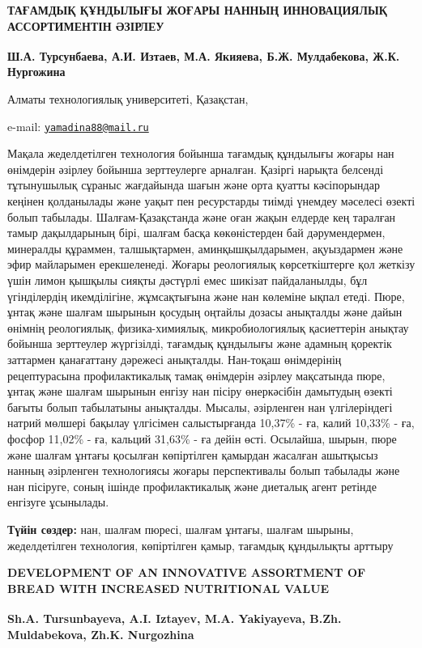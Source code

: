 \begin{articleheader}
{\bfseries ТАҒАМДЫҚ ҚҰНДЫЛЫҒЫ ЖОҒАРЫ НАННЫҢ ИННОВАЦИЯЛЫҚ АССОРТИМЕНТІН ӘЗІРЛЕУ}

{\bfseries
Ш.А. Турсунбаева,
А.И. Изтаев,
М.А. Якияева\textsuperscript{\envelope },
Б.Ж. Мулдабекова,
Ж.К. Нургожина
}
\end{articleheader}

\begin{affiliation}
Алматы технологиялық университеті, Қазақстан,

e-mail: \href{mailto:yamadina88@mail.ru}{\nolinkurl{yamadina88@mail.ru}}
\end{affiliation}

Мақала жеделдетілген технология бойынша тағамдық құндылығы жоғары нан
өнімдерін әзірлеу бойынша зерттеулерге арналған. Қазіргі нарықта
белсенді тұтынушылық сұраныс жағдайында шағын және орта қуатты
кәсіпорындар кеңінен қолданылады және уақыт пен ресурстарды тиімді
үнемдеу мәселесі өзекті болып табылады. Шалғам-Қазақстанда және оған
жақын елдерде кең таралған тамыр дақылдарының бірі, шалғам басқа
көкөністерден бай дәрумендермен, минералды құраммен, талшықтармен,
аминқышқылдарымен, ақуыздармен және эфир майларымен ерекшеленеді. Жоғары
реологиялық көрсеткіштерге қол жеткізу үшін лимон қышқылы сияқты
дәстүрлі емес шикізат пайдаланылды, бұл үгінділердің икемділігіне,
жұмсақтығына және нан көлеміне ықпал етеді. Пюре, ұнтақ және шалғам
шырынын қосудың оңтайлы дозасы анықталды және дайын өнімнің реологиялық,
физика-химиялық, микробиологиялық қасиеттерін анықтау бойынша зерттеулер
жүргізілді, тағамдық құндылығы және адамның қоректік заттармен
қанағаттану дәрежесі анықталды. Нан-тоқаш өнімдерінің рецептурасына
профилактикалық тамақ өнімдерін әзірлеу мақсатында пюре, ұнтақ және
шалғам шырынын енгізу нан пісіру өнеркәсібін дамытудың өзекті бағыты
болып табылатыны анықталды. Мысалы, әзірленген нан үлгілеріндегі натрий
мөлшері бақылау үлгісімен салыстырғанда 10,37\% - ға, калий 10,33\% -
ға, фосфор 11,02\% - ға, кальций 31,63\% - ға дейін өсті. Осылайша,
шырын, пюре және шалғам ұнтағы қосылған көпіртілген қамырдан жасалған
ашытқысыз нанның әзірленген технологиясы жоғары перспективалы болып
табылады және нан пісіруге, соның ішінде профилактикалық және диеталық
агент ретінде енгізуге ұсынылады.

{\bfseries Түйін сөздер:} нан, шалғам пюресі, шалғам ұнтағы, шалғам шырыны,
жеделдетілген технология, көпіртілген қамыр, тағамдық құндылықты арттыру

\begin{articleheader}
{\bfseries DEVELOPMENT OF AN INNOVATIVE ASSORTMENT OF BREAD WITH INCREASED
NUTRITIONAL VALUE}

{\bfseries
Sh.A. Tursunbayeva,
A.I. Iztayev,
M.A. Yakiyayeva\textsuperscript{\envelope },
B.Zh. Muldabekova,
Zh.K. Nurgozhina
}
\end{articleheader}

